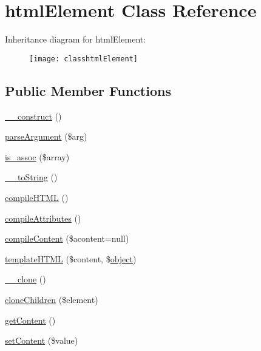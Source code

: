 \hypertarget{classhtmlElement}{}\section{html\+Element Class Reference}
\label{classhtmlElement}
Inheritance diagram for html\+Element\+:\begin{figure}[H]
\begin{center}
\leavevmode
\texttt{[image: classhtmlElement]}
\end{center}
\end{figure}
\subsection*{Public Member Functions}
\begin{DoxyCompactItemize}
\item 
\hyperlink{classhtmlElement_a925a2a3ac520421cc180f391922595af}{\+\_\+\+\_\+construct} ()
\item 
\hyperlink{classhtmlElement_ac36b3e96ac37cad8e499b6dd9dad4511}{parse\+Argument} (\$arg)
\item 
\hyperlink{classhtmlElement_a26a8e3284834135dec7b0e01e84b0877}{is\+\_\+assoc} (\$array)
\item 
\hyperlink{classhtmlElement_a1ad02d4640ea217cafe77a53d8b916f0}{\+\_\+\+\_\+to\+String} ()
\item 
\hyperlink{classhtmlElement_ab45087063ba3e42851d01bd87681475b}{compile\+H\+T\+M\+L} ()
\item 
\hyperlink{classhtmlElement_a4e30cd7e3e6d8ad503766d056490c1ef}{compile\+Attributes} ()
\item 
\hyperlink{classhtmlElement_ac05144459b3739d692738dc947f6989c}{compile\+Content} (\$acontent=null)
\item 
\hyperlink{classhtmlElement_af70cbe9883bbe35f9a2573711625cfc4}{template\+H\+T\+M\+L} (\$content, \$\hyperlink{Shape_8php_a774642dc290de09e3aff55c8b594113f}{object})
\item 
\hyperlink{classhtmlElement_aa52ba0af61d736d37927be6894660cd0}{\+\_\+\+\_\+clone} ()
\item 
\hyperlink{classhtmlElement_a89bb434be414cb5e8422141adf272432}{clone\+Children} (\$element)
\item 
\hyperlink{classhtmlElement_ab74714929671cc7cf3271404a621f4ae}{get\+Content} ()
\item 
\hyperlink{classhtmlElement_abf6e0bb5133c6b654e38cb6a78dc91a8}{set\+Content} (\$value)
\item 

\end{DoxyCompactItemize}
